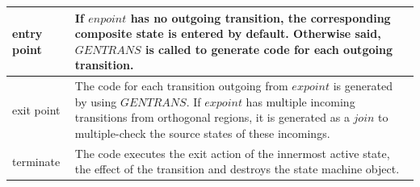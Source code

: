 \begin{table}[]
\begin{tabular}{p{1cm}|p{7.3cm}}
		entry point                                                &        If $enpoint$ has no outgoing transition, the corresponding composite state is entered by default. Otherwise said, $GENTRANS$ is called to generate code for each outgoing transition.                                       \\ \hline
		exit point                                                 &          The code for each transition outgoing from $expoint$ is generated by using $GENTRANS$. If $expoint$ has multiple incoming transitions from orthogonal regions, it is generated as a $join$ to multiple-check the source states of these incomings.                                    \\ \hline
		terminate                                                  &                 The code executes the exit action of the innermost active state, the effect of the transition and destroys the state machine object.                              \\ \hline
	\end{tabular}
\end{table}

 


 

